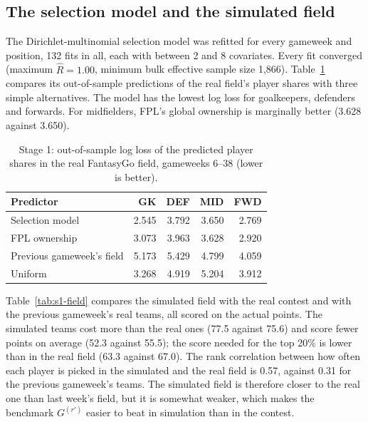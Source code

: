 \subsection{The selection model and the simulated field}
\label{sec:s1-field}

The Dirichlet-multinomial selection model was refitted for every gameweek and position, 132
fits in all, each with between 2 and 8 covariates. Every fit converged (maximum
$\hat R = 1.00$, minimum bulk effective sample size 1{,}866). Table~\ref{tab:s1-oos} compares its
out-of-sample predictions of the real field's player shares with three simple alternatives. The
model has the lowest log loss for goalkeepers, defenders and forwards. For midfielders, FPL's
global ownership is marginally better (3.628 against 3.650).

\begin{table}[ht]
  \centering
  \caption{Stage 1: out-of-sample log loss of the predicted player shares in the real FantasyGo
  field, gameweeks 6--38 (lower is better).}
  \label{tab:s1-oos}
  \begin{tabular}{lrrrr}
    \toprule
    Predictor & GK & DEF & MID & FWD \\
    \midrule
    Selection model         & 2.545 & 3.792 & 3.650 & 2.769 \\
    FPL ownership           & 3.073 & 3.963 & 3.628 & 2.920 \\
    Previous gameweek's field & 5.173 & 5.429 & 4.799 & 4.059 \\
    Uniform                 & 3.268 & 4.919 & 5.204 & 3.912 \\
    \bottomrule
  \end{tabular}
\end{table}

Table~\ref{tab:s1-field} compares the simulated field with the real contest and with the
previous gameweek's real teams, all scored on the actual points. The simulated teams cost more
than the real ones (77.5 against 75.6) and score fewer points on average (52.3 against 55.5);
the score needed for the top 20\% is lower than in the real field (63.3 against 67.0). The rank
correlation between how often each player is picked in the simulated and the real field is
0.57, against 0.31 for the previous gameweek's teams. The simulated field is therefore closer to
the real one than last week's field, but it is somewhat weaker, which makes the benchmark
$G^{(r')}$ easier to beat in simulation than in the contest.

